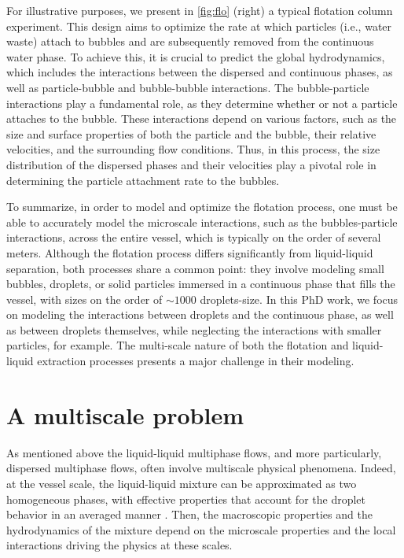 For illustrative purposes, we present in \ref{fig:flo} (right) a typical flotation column experiment. 
This design aims to optimize the rate at which particles (i.e., water waste) attach to bubbles and are subsequently removed from the continuous water phase. 
To achieve this, it is crucial to predict the global hydrodynamics, which includes the interactions between the dispersed and continuous phases, as well as particle-bubble and bubble-bubble interactions.
The bubble-particle interactions play a fundamental role, as they determine whether or not a particle attaches to the bubble. 
These interactions depend on various factors, such as the size and surface properties of both the particle and the bubble, their relative velocities, and the surrounding flow conditions. 
Thus, in this process, the size distribution of the dispersed phases and their velocities play a pivotal role in determining the particle attachment rate to the bubbles.



To summarize, in order to model and optimize the flotation process, one must be able to accurately model the microscale interactions, such as the bubbles-particle interactions, across the entire vessel, which is typically on the order of several meters. 
Although the flotation process differs significantly from liquid-liquid separation, both processes share a common point: they involve modeling small bubbles, droplets, or solid particles immersed in a continuous phase that fills the vessel, with sizes on the order of $\sim 1000$ droplets-size. 
In this PhD work, we focus on modeling the interactions between droplets and the continuous phase, as well as between droplets themselves, while neglecting the interactions with smaller particles, for example. The multi-scale nature of both the flotation and liquid-liquid extraction processes presents a major challenge in their modeling.



\section{A multiscale problem} 


As mentioned above the liquid-liquid multiphase flows, and more particularly, dispersed multiphase flows, often involve multiscale physical phenomena. 
Indeed, at the vessel scale, the liquid-liquid mixture can be approximated as two homogeneous phases, with effective properties that account for the droplet behavior in an averaged manner \citet{jackson2000}.
Then, the macroscopic properties and the hydrodynamics of the mixture depend on the microscale properties and the local interactions driving the physics at these scales. 


